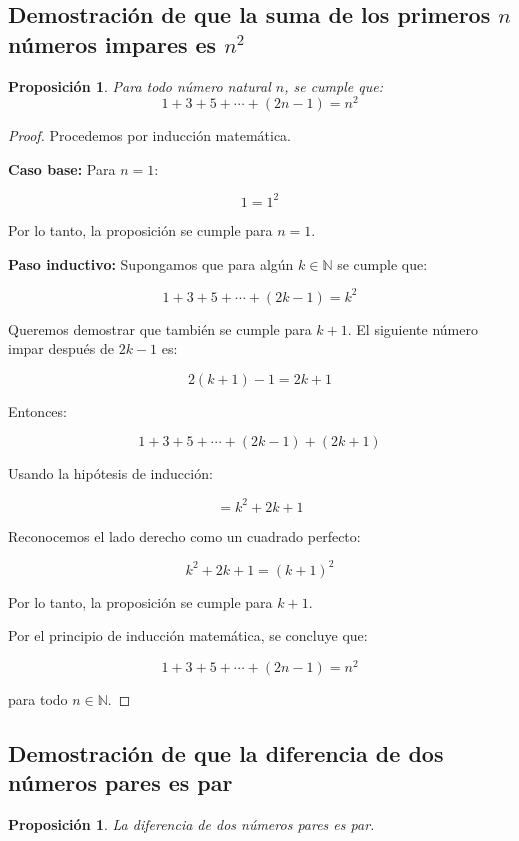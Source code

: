 \documentclass[12pt,final]{report}
\theoremstyle{plain}
\newtheorem{proposition}[theorem]{Proposición}
\theoremstyle{definition}
\begin{document}
\newpage

\subsection{Demostración de que la suma de los primeros $n$ números impares es $n^2$}

\begin{proposition}
Para todo número natural $n$, se cumple que:
\[
1 + 3 + 5 + \cdots + (2n-1) = n^2
\]
\end{proposition}

\begin{proof}

Procedemos por inducción matemática.

\textbf{Caso base:} Para $n=1$:

\[
1 = 1^2
\]

Por lo tanto, la proposición se cumple para $n=1$.

\textbf{Paso inductivo:} Supongamos que para algún $k \in \mathbb{N}$ se cumple que:

\[
1 + 3 + 5 + \cdots + (2k-1) = k^2
\]

Queremos demostrar que también se cumple para $k+1$. El siguiente número impar después de $2k-1$ es:

\[
2(k+1)-1 = 2k+1
\]

Entonces:

\[
1 + 3 + 5 + \cdots + (2k-1) + (2k+1)
\]

Usando la hipótesis de inducción:

\[
= k^2 + 2k + 1
\]

Reconocemos el lado derecho como un cuadrado perfecto:

\[
k^2 + 2k + 1 = (k+1)^2
\]

Por lo tanto, la proposición se cumple para $k+1$.

Por el principio de inducción matemática, se concluye que:

\[
1 + 3 + 5 + \cdots + (2n-1) = n^2
\]

para todo $n \in \mathbb{N}$.

\end{proof}

\newpage

\subsection{Demostración de que la diferencia de dos números pares es par}

\begin{proposition}
La diferencia de dos números pares es par.
\end{proposition}
\end{document}
